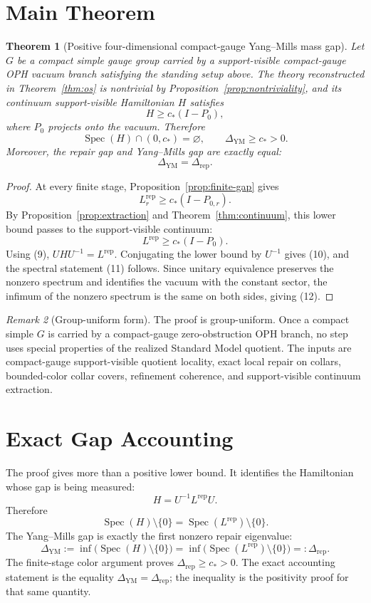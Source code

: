 \documentclass[11pt]{article}
\numberwithin{equation}{section}
\newtheorem{theorem}{Theorem}[section]
\theoremstyle{remark}
\newtheorem{remark}[theorem]{Remark}
\newcommand{\YM}{\mathrm{YM}}
\newcommand{\Rep}{\mathrm{rep}}
\begin{document}
\section{Main Theorem}

\begin{theorem}[Positive four-dimensional compact-gauge Yang--Mills mass gap]
\label{thm:main}
Let \(G\) be a compact simple gauge group carried by a support-visible compact-gauge OPH vacuum
branch satisfying the standing setup above. The theory reconstructed in Theorem~\ref{thm:os} is
nontrivial by Proposition~\ref{prop:nontriviality}, and its continuum support-visible Hamiltonian \(H\)
satisfies
\[
H\ge c_*(I-P_0),
\tag{10}
\]
where \(P_0\) projects onto the vacuum. Therefore
\[
\operatorname{Spec}(H)\cap(0,c_*)=\varnothing,
\qquad
\Delta_{\YM}\ge c_*>0.
\tag{11}
\]
Moreover, the repair gap and Yang--Mills gap are exactly equal:
\[
\Delta_{\YM}=\Delta_{\mathrm{rep}}.
\tag{12}
\]
\end{theorem}

\begin{proof}
At every finite stage, Proposition~\ref{prop:finite-gap} gives
\[
L_r^{\Rep}\ge c_*(I-P_{0,r}).
\]
By Proposition~\ref{prop:extraction} and Theorem~\ref{thm:continuum}, this lower bound passes to
the support-visible continuum:
\[
L^{\mathrm{rep}}\ge c_*(I-P_0).
\]
Using (9), \(UHU^{-1}=L^{\mathrm{rep}}\). Conjugating the lower bound by \(U^{-1}\) gives (10),
and the spectral statement (11) follows. Since unitary equivalence preserves the nonzero spectrum
and identifies the vacuum with the constant sector, the infimum of the nonzero spectrum is the
same on both sides, giving (12).
\end{proof}

\begin{remark}[Group-uniform form]
The proof is group-uniform. Once a compact simple \(G\) is carried by a compact-gauge
zero-obstruction OPH branch, no step uses special properties of the realized Standard Model
quotient. The inputs are compact-gauge support-visible quotient locality, exact local repair on
collars, bounded-color collar covers, refinement coherence, and support-visible continuum
extraction.
\end{remark}

\section{Exact Gap Accounting}

The proof gives more than a positive lower bound. It identifies the Hamiltonian whose gap is
being measured:
\[
H=U^{-1}L^{\mathrm{rep}}U.
\]
Therefore
\[
\operatorname{Spec}(H)\setminus\{0\}
=
\operatorname{Spec}(L^{\mathrm{rep}})\setminus\{0\}.
\]
The Yang--Mills gap is exactly the first nonzero repair eigenvalue:
\[
\Delta_{\YM}
:=
\inf\bigl(\operatorname{Spec}(H)\setminus\{0\}\bigr)
=
\inf\bigl(\operatorname{Spec}(L^{\mathrm{rep}})\setminus\{0\}\bigr)
=:
\Delta_{\mathrm{rep}}.
\]
The finite-stage color argument proves \(\Delta_{\mathrm{rep}}\ge c_*>0\). The exact accounting
statement is the equality \(\Delta_{\YM}=\Delta_{\mathrm{rep}}\); the inequality is the positivity
proof for that same quantity.
\end{document}
